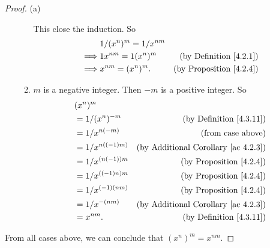 \begin{proof}{(a)}
\begin{enumerate}[label=(\Roman*)]
\begin{enumerate}[label=(\roman*)]
        This close the induction.
        So
        \begin{align*}
        & 1 / (x^n)^m = 1 / x^{nm} \\
        \implies & 1x^{nm} = 1(x^n)^m & \text{(by Definition \ref{4.2.1})} \\
        \implies & x^{nm} = (x^n)^m. & \text{(by Proposition \ref{4.2.4})}
        \end{align*}
        \item \(m\) is a negative integer.
        Then \(-m\) is a positive integer.
        So
        \begin{align*}
        & (x^n)^m \\
        &= 1 / (x^n)^{-m} & \text{(by Definition \ref{4.3.11})} \\
        &= 1 / x^{n(-m)} & \text{(from case above)} \\
        &= 1 / x^{n((-1)m)} & \text{(by Additional Corollary \ref{ac 4.2.3})} \\
        &= 1 / x^{(n(-1))m} & \text{(by Proposition \ref{4.2.4})} \\
        &= 1 / x^{((-1)n)m} & \text{(by Proposition \ref{4.2.4})} \\
        &= 1 / x^{(-1)(nm)} & \text{(by Proposition \ref{4.2.4})} \\
        &= 1 / x^{-(nm)} & \text{(by Additional Corollary \ref{ac 4.2.3})} \\
        &= x^{nm}. & \text{(by Definition \ref{4.3.11})}
        \end{align*}
    \end{enumerate}
\end{enumerate}
From all cases above, we can conclude that \((x^n)^m = x^{nm}\).


\end{proof}
